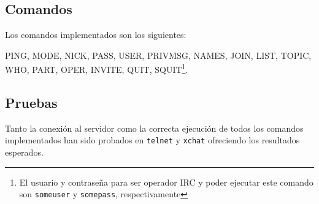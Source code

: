 \documentclass{mathnotes}
\begin{document}
\subsection{Comandos}
Los comandos implementados son los siguientes:

PING, MODE, NICK, PASS, USER, PRIVMSG, NAMES, JOIN, LIST, TOPIC, WHO, PART, OPER, INVITE, QUIT, SQUIT\footnote{El usuario y contraseña para ser operador IRC y poder ejecutar este comando son \texttt{someuser} y \texttt{somepass}, respectivamente}.

\subsection{Pruebas}
Tanto la conexión al servidor como la correcta ejecución de todos los comandos implementados han sido probados en \texttt{telnet} y \texttt{xchat} ofreciendo los resultados esperados.
\end{document}
